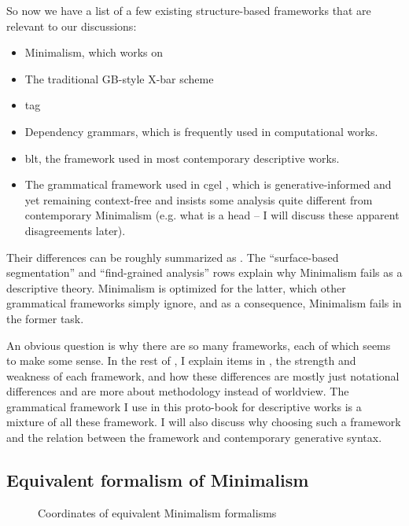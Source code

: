 \documentclass[../main.tex]{subfiles}
\begin{document}
So now we have a list of a few existing structure-based frameworks that are relevant to our discussions:
\begin{itemize}
    \item Minimalism, which works on 
    \item The traditional GB-style X-bar scheme
    \item \ac{tag}  %
    \item Dependency grammars, which is frequently used in computational works.
    \item \ac{blt}, the framework used in most contemporary descriptive works.
    \item The grammatical framework used in \ac{cgel} \citep{cgel,pullum2008expressive}, which is generative-informed and yet remaining 
    context-free and insists some analysis quite different from contemporary Minimalism (e.g. 
    what is a head -- I will discuss these apparent disagreements later).
\end{itemize}
Their differences can be roughly summarized as . 
The ``surface-based segmentation'' and ``find-grained analysis'' rows explain why Minimalism fails as a 
descriptive theory. Minimalism is optimized for the latter, which other grammatical frameworks 
simply ignore, and as a consequence, Minimalism fails in the former task.

An obvious question is why there are so many frameworks, each of which seems to make some sense. 
In the rest of , I explain items in , the strength and weakness 
of each framework, and how these differences
are mostly just notational differences and are more about methodology instead of worldview. The grammatical framework I use in this proto-book for 
descriptive works is a mixture of all these framework. I will also discuss why choosing such a 
framework and the relation between the framework and contemporary generative syntax.



\subsection{Equivalent formalism of Minimalism}

\begin{figure}
    \centering
    
    \caption{Coordinates of equivalent Minimalism formalisms} 
    \label{fig:coordinate-minimalism}
\end{figure}
\end{document}
